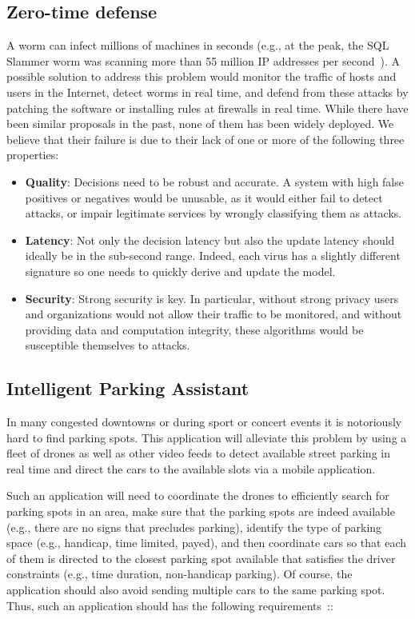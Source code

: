 \subsection{Zero-time defense}

A worm can infect millions of machines in seconds (e.g., at the peak, the SQL Slammer worm was scanning more than 55 million IP addresses per second~\cite{SQLSlammer}). A possible solution to address this problem would monitor the traffic of hosts and users in the Internet, detect worms in real time, and defend from these attacks by patching the software or installing rules at firewalls in real time. While there have been similar proposals in the past, none of them has been widely deployed. We believe that their failure is due to their lack of one or more of the following three properties:

\begin{itemize}[noitemsep,topsep=0pt,parsep=0pt,partopsep=0pt]
\item {\bf Quality}: Decisions need to be robust and accurate. A system with high false positives or negatives would be unusable, as it would either fail to detect attacks, or impair legitimate services by wrongly classifying them as attacks.
\item {\bf Latency}: Not only the decision latency but also the update latency should ideally be in the sub-second range. Indeed, each virus has a slightly different signature so one needs to quickly derive and update the model. 
\item {\bf Security}: Strong security is key. In particular, without strong privacy users and organizations would not allow their traffic to be monitored, and without providing data and computation integrity, these algorithms would be susceptible themselves to attacks.
\end{itemize}

\subsection{Intelligent Parking Assistant}

In many congested downtowns or during sport or concert events it is notoriously hard to find parking spots. This application will alleviate this problem by using a fleet of drones as well as other video feeds to detect available street parking in real time and direct the cars to the available slots via a mobile application. 

Such an application will need to coordinate the drones to efficiently search for parking spots in an area, make sure that the parking spots are indeed available (e.g., there are no signs that precludes parking), identify the type of parking space (e.g., handicap, time limited, payed), and then coordinate cars so that each of them is directed to the closest parking spot available that satisfies the driver constraints (e.g., time duration, non-handicap parking). Of course, the application should also avoid sending multiple cars to the same parking spot. Thus, such an application should has the following requirements~\cite{Quaritsch08, Mottola14}::

